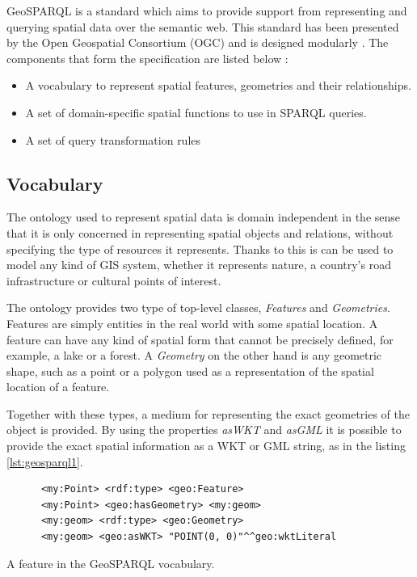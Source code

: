 GeoSPARQL is a standard which aims to provide support from representing and querying spatial data over the semantic web. This standard has been presented by the Open Geospatial Consortium (OGC) and is designed modularly \cite{geosparqlspec, battle2012enabling}. The components that form the specification are listed below \cite{battle2011linking}:

\begin{itemize}
	\item A vocabulary to represent spatial features, geometries and their relationships.
	\item A set of domain-specific spatial functions to use in SPARQL queries.
	\item A set of query transformation rules
\end{itemize}

\subsection*{Vocabulary}

The ontology used to represent spatial data is domain independent in the sense that it is only concerned in representing spatial objects and relations, without specifying the type of resources it represents. Thanks to this is can be used to model any kind of GIS system, whether it represents nature, a country's road infrastructure or cultural points of interest.

The ontology provides two type of top-level classes, \textit{Features} and \textit{Geometries}. Features are simply entities in the real world with some spatial location. A feature can have any kind of spatial form that cannot be precisely defined, for example, a lake or a forest. A \textit{Geometry} on the other hand is any geometric shape, such as a point or a polygon used as a representation of the spatial location of a feature.

Together with these types, a medium for representing the exact geometries of the object is provided. By using the properties \textit{asWKT} and \textit{asGML} it is possible to provide the exact spatial information as a WKT or GML\cite{gmlspec} string, as in the listing \ref{lst:geosparql1}.

\begin{listing}\centering
  \begin{minipage}{.6\textwidth}
    \begin{verbatim}
      <my:Point> <rdf:type> <geo:Feature> 
      <my:Point> <geo:hasGeometry> <my:geom>
      <my:geom> <rdf:type> <geo:Geometry>
      <my:geom> <geo:asWKT> "POINT(0, 0)"^^geo:wktLiteral
    \end{verbatim}
  \end{minipage}
  \caption{A feature in the GeoSPARQL vocabulary.}\label{lst:geosparql1}
\end{listing}

